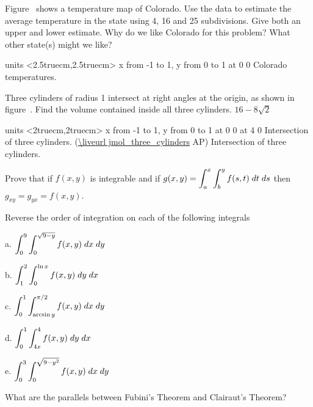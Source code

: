 \endexercise

\exercise Figure~ shows a temperature map
of Colorado.  Use the data to estimate the average temperature in the
state using 4, 16 and 25 subdivisions.  Give both an upper and lower
estimate.  Why do we like Colorado for this problem?  What other
state(s) might we like?

\figure
\texonly
\vbox{\beginpicture
\setcoordinatesystem units <2.5truecm,2.5truecm>
\setplotarea x from -1 to 1, y from 0 to 1
 at 0 0
\endpicture}
\endtexonly
{}
\begincaption
Colorado temperatures.
\endcaption
\endfigure
\endexercise

\exercise Three cylinders of radius 1 intersect at right angles at the
origin, as shown in figure~. Find the
volume contained inside all three cylinders.
\answer $16-8\sqrt{2}$
\endanswer

\figure
\texonly
\vbox{\beginpicture
\normalgraphs
\ninepoint
\setcoordinatesystem units <2truecm,2truecm>
\setplotarea x from -1 to 1, y from 0 to 1
 at 0 0
 at 4 0
\endpicture}
\begincaption
Intersection of three cylinders.
(\expandafter\url\expandafter{\liveurl jmol_three_cylinders}%
AP\endurl)
\endcaption
\endtexonly
{}
\begincaption
Intersection of three cylinders.
\endcaption
\endfigure
\endexercise

\exercise Prove that if $f(x,y)$ is integrable and if $\displaystyle g(x,y)=\int_a^x
    \int_b^y f(s,t) \; dt \; ds$ then $g_{xy}=g_{yx}=f(x,y)$.
\endexercise

\exercise Reverse the order of integration on each of the following integrals

\beginlist
\item{a.} $\displaystyle\int_0^9 \int_0^{\sqrt{9-y}} f(x,y)\; dx \; dy$
\item{b.} $\displaystyle\int_1^2 \int_0^{\ln x} f(x,y) \; dy \; dx $
\item{c.} $\displaystyle\int_0^1 \int_{\arcsin y}^{\pi/2} f(x,y) \; dx \; dy$
\item{d.} $\displaystyle\int_0^1 \int_{4x}^{4} f(x,y) \; dy \; dx$
\item{e.} $\displaystyle\int_0^3 \int_{0}^{\sqrt{9-y^2}} f(x,y) \; dx \; dy$
\endlist

\endexercise

\exercise What are the parallels between Fubini's
    Theorem and Clairaut's Theorem?
\endexercise

\endexercises


